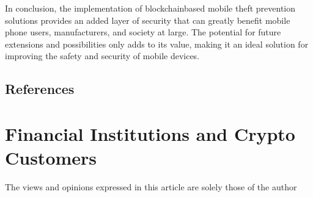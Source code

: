 \documentclass[letterpaper,10pt,english]{jupyterBook}
\begin{document}
\sphinxAtStartPar
In conclusion, the implementation of blockchain\sphinxhyphen{}based mobile theft prevention solutions provides an added layer of security that can greatly benefit mobile phone users, manufacturers, and society at large. The potential for future extensions and possibilities only adds to its value, making it an ideal solution for improving the safety and security of mobile devices.




\subsection{References}
\label{\detokenize{MTP/mtp:references}}
\sphinxstepscope


\section{Financial Institutions and Crypto Customers}
\label{\detokenize{LEGACY/legacy:financial-institutions-and-crypto-customers}}\label{\detokenize{LEGACY/legacy::doc}}
\sphinxAtStartPar
{}

\sphinxAtStartPar
{} The views and opinions expressed in this article are solely those of the author
\end{document}

